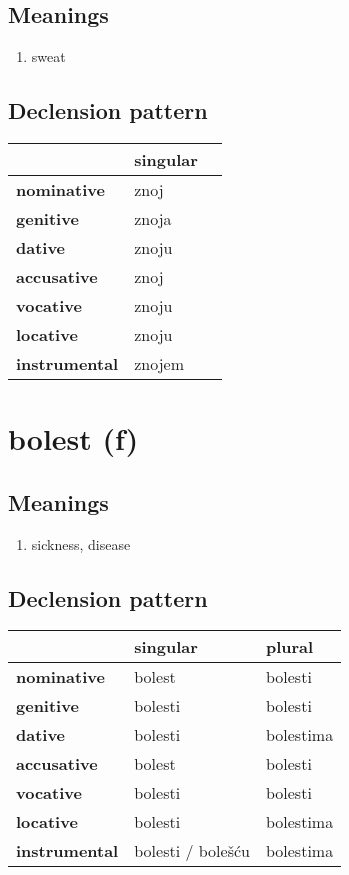 \subsection*{Meanings}
\begin{enumerate}
\item sweat
\end{enumerate}
\subsection*{Declension pattern}
\begin{tabularx}{\linewidth}{Xll}
\toprule
{} & singular \\
\midrule
\textbf{nominative  } &     znoj \\
\textbf{genitive    } &    znoja \\
\textbf{dative      } &    znoju \\
\textbf{accusative  } &     znoj \\
\textbf{vocative    } &    znoju \\
\textbf{locative    } &    znoju \\
\textbf{instrumental} &   znojem \\
\bottomrule
\end{tabularx}

\filbreak
\section{bolest (f)}
\subsection*{Meanings}
\begin{enumerate}
\item sickness, disease
\end{enumerate}
\subsection*{Declension pattern}
\begin{tabularx}{\linewidth}{Xll}
\toprule
{} &           singular &     plural \\
\midrule
\textbf{nominative  } &             bolest &    bolesti \\
\textbf{genitive    } &            bolesti &    bolesti \\
\textbf{dative      } &            bolesti &  bolestima \\
\textbf{accusative  } &             bolest &    bolesti \\
\textbf{vocative    } &            bolesti &    bolesti \\
\textbf{locative    } &            bolesti &  bolestima \\
\textbf{instrumental} &  bolesti / bolešću &  bolestima \\
\bottomrule
\end{tabularx}

